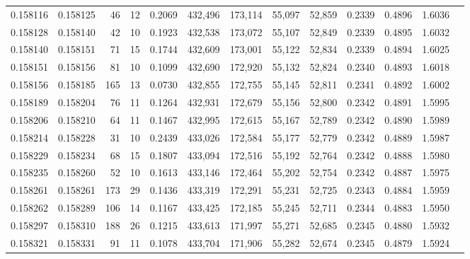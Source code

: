 \begin{tabular}{rrrrrrrrrrrrr}
0.158116 & 0.158125 &    46 &  12 &                                     0.2069 & 432,496 & 173,114 &  55,097 &  52,859 & 0.2339 & 0.4896 & 1.6036 \\
0.158128 & 0.158140 &    42 &  10 &                                     0.1923 & 432,538 & 173,072 &  55,107 &  52,849 & 0.2339 & 0.4895 & 1.6032 \\
0.158140 & 0.158151 &    71 &  15 &                                     0.1744 & 432,609 & 173,001 &  55,122 &  52,834 & 0.2339 & 0.4894 & 1.6025 \\
0.158151 & 0.158156 &    81 &  10 &                                     0.1099 & 432,690 & 172,920 &  55,132 &  52,824 & 0.2340 & 0.4893 & 1.6018 \\
0.158156 & 0.158185 &   165 &  13 &                                     0.0730 & 432,855 & 172,755 &  55,145 &  52,811 & 0.2341 & 0.4892 & 1.6002 \\
0.158189 & 0.158204 &    76 &  11 &                                     0.1264 & 432,931 & 172,679 &  55,156 &  52,800 & 0.2342 & 0.4891 & 1.5995 \\
0.158206 & 0.158210 &    64 &  11 &                                     0.1467 & 432,995 & 172,615 &  55,167 &  52,789 & 0.2342 & 0.4890 & 1.5989 \\
0.158214 & 0.158228 &    31 &  10 &                                     0.2439 & 433,026 & 172,584 &  55,177 &  52,779 & 0.2342 & 0.4889 & 1.5987 \\
0.158229 & 0.158234 &    68 &  15 &                                     0.1807 & 433,094 & 172,516 &  55,192 &  52,764 & 0.2342 & 0.4888 & 1.5980 \\
0.158235 & 0.158260 &    52 &  10 &                                     0.1613 & 433,146 & 172,464 &  55,202 &  52,754 & 0.2342 & 0.4887 & 1.5975 \\
0.158261 & 0.158261 &   173 &  29 &                                     0.1436 & 433,319 & 172,291 &  55,231 &  52,725 & 0.2343 & 0.4884 & 1.5959 \\
0.158262 & 0.158289 &   106 &  14 &                                     0.1167 & 433,425 & 172,185 &  55,245 &  52,711 & 0.2344 & 0.4883 & 1.5950 \\
0.158297 & 0.158310 &   188 &  26 &                                     0.1215 & 433,613 & 171,997 &  55,271 &  52,685 & 0.2345 & 0.4880 & 1.5932 \\
0.158321 & 0.158331 &    91 &  11 &                                     0.1078 & 433,704 & 171,906 &  55,282 &  52,674 & 0.2345 & 0.4879 & 1.5924 \\

\end{tabular}
